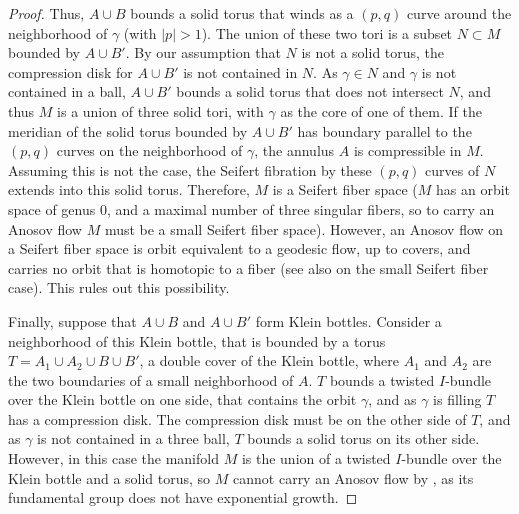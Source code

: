 \documentclass[12pt]{amsart}
\theoremstyle{definition}
\theoremstyle{remark}
\begin{document}
\begin{proof}
Thus, $A\cup B$ bounds a solid torus that winds as a $(p,q)$ curve around the neighborhood of $\gamma$ (with $|p|>1$). The union of these two tori is a subset $N\subset M$ bounded by $A\cup B'$. By our assumption that $N$ is not a solid torus, the compression disk for $A\cup B'$ is not contained in $N$. As $\gamma\in N$ and $\gamma$ is not contained in a ball,  $A\cup B'$ bounds a solid torus that does not intersect $N$, and thus $M$ is a union of three solid tori, with $\gamma$ as the core of one of them.
If the meridian of the solid torus bounded by $A\cup B'$ has boundary parallel to the $(p,q)$ curves on the neighborhood of $\gamma$, the annulus $A$ is compressible in $M$. Assuming this is not the case, the Seifert fibration by these $(p,q)$ curves of $N$ extends into this solid torus.
Therefore, $M$ is a Seifert fiber space ($M$ has an orbit space of genus 0, and a maximal number of three singular fibers, so to carry an Anosov flow $M$ must be a small Seifert fiber space). However, an Anosov flow on a Seifert fiber space is orbit equivalent to a geodesic flow, up to covers, and carries no orbit that is homotopic to a fiber \cite{Barbot1996Waldhousen} (see also \cite{HammerlindlPotrieShannon} on the small Seifert fiber case). This rules out this possibility.

Finally, suppose that $A\cup B$ and $A\cup B'$ form Klein bottles. Consider a neighborhood of this Klein bottle, that is bounded by a torus $T=A_1\cup A_2\cup B\cup B'$, a double cover of the Klein bottle, where $A_1$ and $A_2$ are the two boundaries of a small neighborhood of $A$. $T$ bounds a twisted $I$-bundle over the Klein bottle on one side, that contains the orbit $\gamma$, and as $\gamma$ is filling $T$ has a compression disk. The compression disk must be on the other side of $T$, and as $\gamma$ is not contained in a three ball, $T$ bounds a solid torus on its other side.
However, in this case the manifold $M$ is the union of a twisted $I$-bundle over the Klein bottle and a solid torus, so $M$  cannot carry an Anosov flow by \cite{PlanteThurstonFundamentalGroup}, as its fundamental group does not have exponential growth.
\end{proof}
\end{document}

